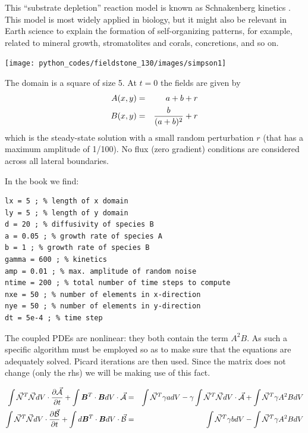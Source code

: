 This ``substrate depletion'' reaction
model is known as Schnakenberg kinetics \cite{gime72,schn79}. This
model is most widely applied in biology, but it might also be relevant 
in Earth science to explain
the formation of self-organizing patterns, for example, 
related to mineral growth, stromatolites and
corals, concretions, and so on.

\begin{center}
\texttt{[image: python\_codes/fieldstone\_130/images/simpson1]}
\end{center}

The domain is a square of size 5. At $t=0$ the fields are given by
\begin{eqnarray}
A(x,y)&=&a+b+r \nonumber\\
B(x,y)&=& \frac{b}{(a+b)^2} +r
\end{eqnarray}
which is the steady-state solution with a small random 
perturbation $r$ (that has a maximum amplitude
of 1/100). No flux (zero gradient) conditions are considered across 
all lateral boundaries.

In the book we find: 
\begin{verbatim}
lx = 5 ; % length of x domain
ly = 5 ; % length of y domain
d = 20 ; % diffusivity of species B
a = 0.05 ; % growth rate of species A
b = 1 ; % growth rate of species B
gamma = 600 ; % kinetics
amp = 0.01 ; % max. amplitude of random noise
ntime = 200 ; % total number of time steps to compute
nxe = 50 ; % number of elements in x-direction
nye = 50 ; % number of elements in y-direction
dt = 5e-4 ; % time step
\end{verbatim}

The coupled PDEs are nonlinear: they both contain the term $A^2B$. As such 
a specific algorithm must be employed so as to make sure that the 
equations are adequately solved. Picard iterations are then used.
Since the matrix does not change (only the rhs) we will be making use of this fact.

\begin{eqnarray}
\int \vec{{\mathcal{N}}}^T \vec{{\mathcal{N}}} dV \cdot \frac{\partial \vec{\cal A}}{\partial t} + 
\int {\bm B}^T \cdot {\bm B} dV \cdot \vec{\cal A} 
&=& \int \vec{{\mathcal{N}}}^T \gamma a dV 
- \gamma\int \vec{{\mathcal{N}}}^T \vec{{\mathcal{N}}} dV \cdot \vec{\cal A}
+ \int \vec{{\mathcal{N}}}^T \gamma A^2 B dV \nonumber\\ 
\int \vec{{\mathcal{N}}}^T \vec{{\mathcal{N}}} dV \cdot \frac{\partial \vec{\cal B}}{\partial t} + 
\int d {\bm B}^T \cdot {\bm B} dV \cdot \vec{\cal B} 
&=& \int \vec{{\mathcal{N}}}^T \gamma b dV 
- \int \vec{{\mathcal{N}}}^T \gamma A^2 B dV 
\end{eqnarray}

